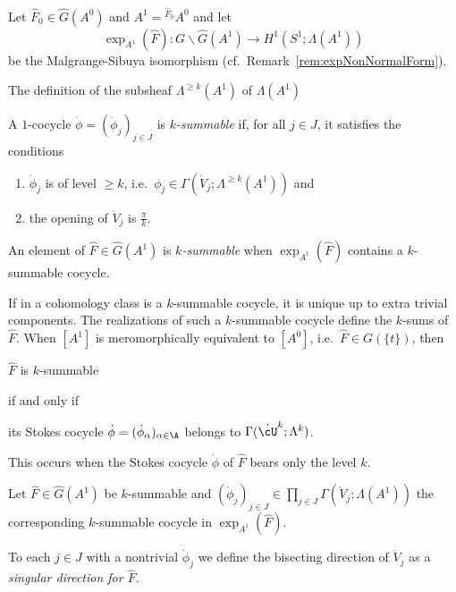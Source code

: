 Let $\hat F_0\in\hat G(A^0)$ and $A^1={}^{\hat F_0}\!A^0$ and let
\[
  \exp_{A^1}(\hat F):G\backslash\hat G(A^1) \to H^1(S^1;\Lambda(A^1))
\]
be the Malgrange-Sibuya isomorphism (cf.\ Remark~\ref{rem:expNonNormalForm}).

The definition of the subsheaf $\Lambda^{\geq k}(A^1)$ of $\Lambda(A^1)$
 \TODO{}

\begin{defn}
  A $1$-cocycle $\dot\phi=(\dot\phi_j)_{j\in J}$ is \emph{$k$-summable} if, for
  all $j\in J$, it satisfies the conditions
  \begin{enumerate}
    \item $\dot\phi_j$ is of level $\geq k$,
      i.e.\ $\phi_j\in\Gamma(\dot V_j;\Lambda^{\geq k}(A^1))$ and
    \item the opening of $\dot V_j$ is $\frac{\pi}{k}$.
  \end{enumerate}
  An element of $\hat F\in\hat G(A^1)$ is \emph{$k$-summable} when
  $\exp_{A^1}(\hat F)$ contains a $k$-summable cocycle.
\end{defn}

If in a cohomology class is a $k$-summable cocycle, it is unique up to extra
trivial components.
The realizations of such a $k$-summable cocycle define the $k$-sums of
$\hat F$.
When $[A^1]$ is meromorphically equivalent to $[A^0]$,
i.e.\ $\hat F\in G(\!\{t\}\!)$, then
\begin{einr}
  $\hat F$ is $k$-summable
\end{einr}
if and only if
\begin{einr}
  its Stokes cocycle $\dot\phi=(\dot\phi_\alpha)_{\alpha\in\A}$ belongs to
  $\Gamma(\dot\cU^k;\Lambda^k)$.
\end{einr}
This occurs when the Stokes cocycle $\dot\phi$ of $\hat F$ bears only the level
$k$.

\begin{comment}
  \cite[883]{Loday1994} Turrittin's problem
\end{comment}

\begin{defn}\label{defn:singlDir}
  Let $\hat F\in\hat G(A^1)$ be $k$-summable and $(\dot\phi_j)_{j\in
  J}\in\prod_{j\in J}\Gamma(\dot V_j;\Lambda(A^1))$ the corresponding
  $k$-summable cocycle in $\exp_{A^1}(\hat F)$.

  To each $j\in J$ with a nontrivial $\dot\phi_j$ we define the bisecting
  direction of $\dot V_j$ as a \emph{singular direction for $\hat F$}.
\end{defn}

